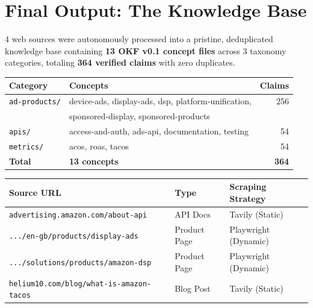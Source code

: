 \documentclass[11pt,a4paper]{article}
\begin{document}
\section{Final Output: The Knowledge Base}

\begin{successbox}
4 web sources were autonomously processed into a pristine, deduplicated knowledge base containing \textbf{13 OKF v0.1 concept files} across 3 taxonomy categories, totaling \textbf{364 verified claims} with zero duplicates.
\end{successbox}

\begin{center}
\renewcommand{\arraystretch}{1.3}
\begin{tabular}{@{} l l r @{}}
\toprule
\textbf{Category} & \textbf{Concepts} & \textbf{Claims} \\
\midrule
\texttt{ad-products/} & device-ads, display-ads, dsp, platform-unification, & 256 \\
 & sponsored-display, sponsored-products & \\
\texttt{apis/} & access-and-auth, ads-api, documentation, testing & 54 \\
\texttt{metrics/} & acos, roas, tacos & 54 \\
\midrule
\textbf{Total} & \textbf{13 concepts} & \textbf{364} \\
\bottomrule
\end{tabular}
\end{center}

\bigskip

\begin{center}
\renewcommand{\arraystretch}{1.3}
\begin{tabular}{@{} l l l @{}}
\toprule
\textbf{Source URL} & \textbf{Type} & \textbf{Scraping Strategy} \\
\midrule
\texttt{advertising.amazon.com/about-api} & API Docs & Tavily (Static) \\
\texttt{.../en-gb/products/display-ads} & Product Page & Playwright (Dynamic) \\
\texttt{.../solutions/products/amazon-dsp} & Product Page & Playwright (Dynamic) \\
\texttt{helium10.com/blog/what-is-amazon-tacos} & Blog Post & Tavily (Static) \\
\bottomrule
\end{tabular}
\end{center}
\end{document}
